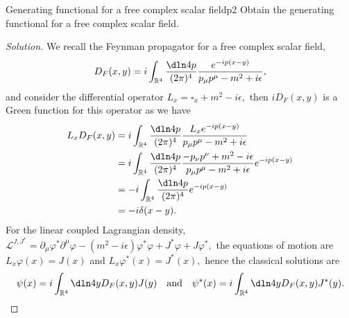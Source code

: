 \begin{problem}{Generating functional for a free complex scalar field}{p2}
    Obtain the generating functional for a free complex scalar field.
\end{problem}
\begin{proof}[Solution]
    We recall the Feynman propagator for a free complex scalar field,
    \begin{equation*}
        D_F(x,y) = i \int_{\mathbb{R}^4}\frac{\dln4p}{(2\pi)^4} \frac{e^{-ip(x-y)}}{p_\mu p^\mu - m^2 + i \epsilon},
    \end{equation*}
    and consider the differential operator \(L_x = \square_x + m^2 - i \epsilon,\) then \(iD_F(x,y)\) is a Green function for this operator as we have
    \begin{align*}
        L_x D_F(x,y) &= i \int_{\mathbb{R}^4} \frac{\dln4p}{(2\pi)^4} \frac{L_x e^{-i p(x-y)}}{p_\mu p^\mu - m^2 + i \epsilon}\\
                     &= i \int_{\mathbb{R}^4} \frac{\dln4p}{(2\pi)^4} \frac{-p_\nu p^\nu + m^2 - i \epsilon}{p_\mu p^\mu - m^2 + i \epsilon} e^{-ip(x-y)}\\
                     &= -i \int_{\mathbb{R}^4} \frac{\dln4p}{(2\pi)^4} e^{-ip(x-y)}\\
                     &= -i \delta(x-y).
    \end{align*}
    For the linear coupled Lagrangian density, \(\mathcal{L}^{J,J^*} = \partial_\mu \varphi^* \partial^\mu \varphi - (m^2 - i \epsilon) \varphi^* \varphi + J^* \varphi + J \varphi^*,\) the equations of motion are \(L_x \varphi(x) = J(x)\) and \(L_x \varphi^*(x) = J^*(x),\) hence the classical solutions are
    \begin{equation*}
        \psi(x) = i \int_{\mathbb{R}^4} \dln4{y}D_F(x,y) J(y)
        \quad\text{and}\quad
        \psi^*(x) = i \int_{\mathbb{R}^4} \dln4{y}D_F(x,y) J^*(y).
    \end{equation*}


\end{proof}
